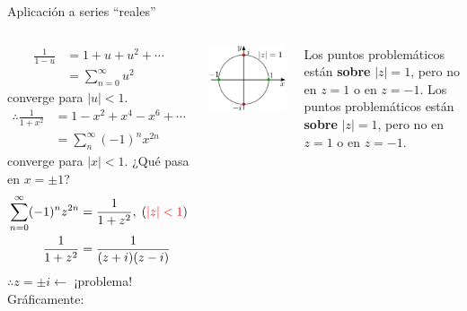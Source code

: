 \documentclass[9pt, aspectratio=169]{beamer}
\begin{document}
\begin{frame}{Aplicación a series ``reales''}
    \begin{columns}[c]
    \begin{align*}
    \frac{1}{1 - u} &= 1 + u + u^2 + \cdots \\
                    &= \sum_{n = 0}^{\infty} u^2
    \end{align*}
    converge para $|u| < 1$.
    \begin{align*}
    \therefore \frac{1}{1 + x^2} &= 1 - x^2 + x^4 - x^6 + \cdots \\
                                 &= \sum_{n}^{\infty} (-1)^n x^{2n}
    \end{align*}
    converge para $|x| < 1$.
    ¿Qué pasa en $x = \pm 1$?
    \begin{align*}
        \sum_{n = 0}^{\infty} (-1)^n z^{2n} &= \frac{1}{1 + z^2}, \; ({\color{red}|z| < 1}) \\
    \frac{1}{1 + z^2} &= \frac{1}{(z + i)(z -i)}
    \end{align*}
$\therefore z = \pm i \leftarrow $ \alert{¡problema!}
    Gráficamente:
    \begin{center}
    \includegraphics[scale=0.40]{figs/fig-09.pdf}
    \end{center}
    Los puntos problemáticos están \textbf{sobre} $|z| = 1$, pero no en $z = 1$ o en $z = -1$.
    Los puntos problemáticos están \textbf{sobre} $|z| = 1$, pero no en $z = 1$ o en $z = -1$.
    \end{columns}
\end{frame}
\end{document}
